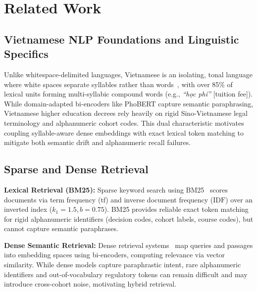 \section{Related Work}
\label{sec:related}



\subsection{Vietnamese NLP Foundations and Linguistic Specifics}
\label{sec:vietnamese_nlp}

Unlike whitespace-delimited languages, Vietnamese is an isolating, tonal language where white spaces separate syllables rather than words~\cite{nguyen2020phobert}, with over 85\% of lexical units forming multi-syllabic compound words (e.g., \textit{``h\d{o}c ph\'i''} [tuition fee]). While domain-adapted bi-encoders like PhoBERT capture semantic paraphrasing, Vietnamese higher education decrees rely heavily on rigid Sino-Vietnamese legal terminology and alphanumeric cohort codes. This dual characteristic motivates coupling syllable-aware dense embeddings with exact lexical token matching to mitigate both semantic drift and alphanumeric recall failures.

\subsection{Sparse and Dense Retrieval}
\label{sec:sparse_dense}

\textbf{Lexical Retrieval (BM25):} Sparse keyword search using BM25~\cite{robertson2009bm25} scores documents via term frequency ($\mathrm{tf}$) and inverse document frequency ($\mathrm{IDF}$) over an inverted index ($k_1 = 1.5, b = 0.75$). BM25 provides reliable exact token matching for rigid alphanumeric identifiers (decision codes, cohort labels, course codes), but cannot capture semantic paraphrases.

\textbf{Dense Semantic Retrieval:} Dense retrieval systems~\cite{karpukhin2020dpr,lewis2020rag} map queries and passages into embedding spaces using bi-encoders, computing relevance via vector similarity. While dense models capture paraphrastic intent, rare alphanumeric identifiers and out-of-vocabulary regulatory tokens can remain difficult and may introduce cross-cohort noise, motivating hybrid retrieval.

